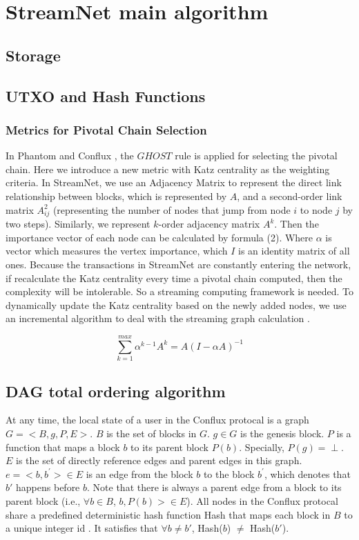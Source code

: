 \section{StreamNet main algorithm}

\subsection{Storage}

\subsection{UTXO and Hash Functions}
\subsubsection{Metrics for Pivotal Chain Selection}
In Phantom \cite{sompolinskyphantom} and Conflux \cite{li2018scaling}, the $GHOST$ rule \cite{sompolinsky2015secure} is applied for selecting the pivotal chain.
Here we introduce a new metric with Katz centrality \cite{katz1953new} as the weighting criteria. 
In StreamNet, we use an Adjacency Matrix to represent the direct link relationship between blocks, which is represented by $A$,
and a second-order link matrix $A^2_{ij}$ (representing the number of nodes that jump from node $i$ to node $j$ by two steps).
Similarly, we represent $k$-order adjacency matrix $A^k$.
Then the importance vector of each node can be calculated by formula (2). 
Where $\alpha$ is vector which measures the vertex importance, which $I$ is an identity matrix of all ones.
Because the transactions in StreamNet are constantly entering the network, 
if recalculate the Katz centrality every time a pivotal chain computed, 
then the complexity will be intolerable. 
So a streaming computing framework is needed. 
To dynamically update the Katz centrality based on the newly added nodes, 
we use an incremental algorithm to deal with the streaming graph calculation \cite{nathan2018incrementally}.

\begin{equation}
\label{simple_equation}
\sum_{k=1}^{max} \alpha^{k-1}A^{k}=A(I-\alpha A)^{-1}
\end{equation}

\subsection{DAG total ordering algorithm}
At any time, the local state of a user in the Conflux protocal is a graph $G = <B,g,P,E>$. $B$ is the set of blocks in $G$. $g \in G$ is the genesis block. $P$ is a function that maps a block $b$ to its parent block $P(b)$. Specially, $P(g) = \perp$. $E$ is the set of directly reference edges and parent edges in this graph. $e = <b,b^'> \in E$ is an edge from the block $b$ to the block $b^'$, which denotes that $b'$ happens before $b$. Note that there is always a parent edge from a block to its parent block (i.e., $\forall b \in B$, $b, P(b)> \in E$). All nodes in the Conflux protocal share a predefined deterministic hash function Hash that maps each block in $B$ to a unique integer id . It satisfies that $\forall {b} \neq {b'}$, Hash($b$) $\neq$ Hash($b'$).

